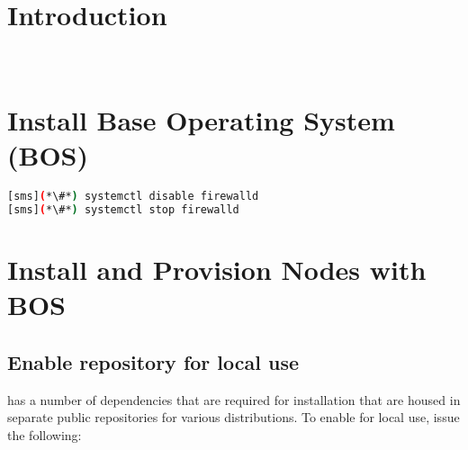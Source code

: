 \documentclass[letterpaper]{article}
\begin{document}
\graphicspath{{common/figures/}}
\thispagestyle{empty}


 

\newpage
\tableofcontents
\newpage


\section{Introduction} \label{sec:introduction}

 \\








\section{Install Base Operating System (BOS)}


\begin{lstlisting}[language=bash,keywords={}]
[sms](*\#*) systemctl disable firewalld
[sms](*\#*) systemctl stop firewalld
\end{lstlisting}


\section{Install \xCAT{} and Provision Nodes with BOS} \label{sec:provision_compute_bos}


\subsection{Enable \xCAT{} repository for local use} \label{sec:enable_xcat}


\noindent \xCAT{} has a number of dependencies that are required for
installation that are housed in separate public repositories for various
distributions. To enable for local use, issue the following:
\end{document}
